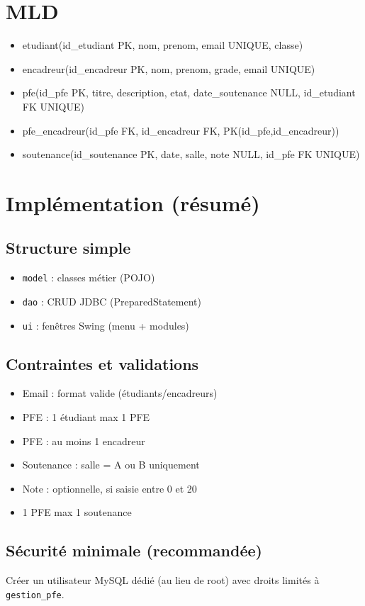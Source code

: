 \documentclass[12pt,a4paper]{article}
\begin{document}
\section{MLD}
\begin{itemize}
  \item etudiant(id\_etudiant PK, nom, prenom, email UNIQUE, classe)
  \item encadreur(id\_encadreur PK, nom, prenom, grade, email UNIQUE)
  \item pfe(id\_pfe PK, titre, description, etat, date\_soutenance NULL, id\_etudiant FK UNIQUE)
  \item pfe\_encadreur(id\_pfe FK, id\_encadreur FK, PK(id\_pfe,id\_encadreur))
  \item soutenance(id\_soutenance PK, date, salle, note NULL, id\_pfe FK UNIQUE)
\end{itemize}

\section{Implémentation (résumé)}
\subsection{Structure simple}
\begin{itemize}
  \item \texttt{model} : classes métier (POJO)
  \item \texttt{dao} : CRUD JDBC (PreparedStatement)
  \item \texttt{ui} : fenêtres Swing (menu + modules)
\end{itemize}

\subsection{Contraintes et validations}
\begin{itemize}
  \item Email : format valide (étudiants/encadreurs)
  \item PFE : 1 étudiant \rightarrow max 1 PFE
  \item PFE : au moins 1 encadreur
  \item Soutenance : salle = A ou B uniquement
  \item Note : optionnelle, si saisie entre 0 et 20
  \item 1 PFE \rightarrow max 1 soutenance
\end{itemize}

\subsection{Sécurité minimale (recommandée)}
Créer un utilisateur MySQL dédié (au lieu de root) avec droits limités à \texttt{gestion\_pfe}.
\end{document}
